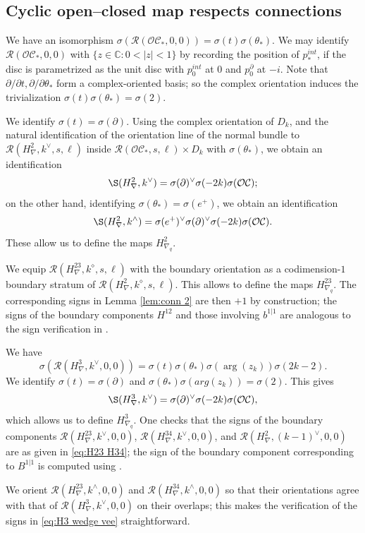 \documentclass{article}
\def\cO{\mathcal{O}}
\def\cC{\mathcal{C}}
\def\cR{\mathcal{R}}
\def\C{\mathbb{C}}
\begin{document}
\subsection{Cyclic open--closed map respects connections}

We have an isomorphism $\sigma(\cR(\cO\cC_*,0,0)) = \sigma(t)\sigma(\theta_*)$. 
We may identify $\cR(\cO\cC_*,0,0)$ with $\{z \in \C: 0<|z|<1\}$ by recording the position of $p_*^{int}$, if the disc is parametrized as the unit disc with $p_0^{int}$ at $0$ and $p_0^\partial$ at $-i$. 
Note that $\partial/\partial t, \partial/\partial \theta_*$ form a complex-oriented basis; so the complex orientation induces the trivialization $\sigma(t)\sigma(\theta_*) = \sigma(2)$.

We identify $\sigma(t) = \sigma(\partial)$. 
Using the complex orientation of $D_k$, and the natural identification of the orientation line of the normal bundle to $\cR(H^2_\nabla,k^\vee,s,\ell)$ inside $\cR(\cO\cC_*,s,\ell) \times D_k$ with $\sigma(\theta_*)$, we obtain an identification
$$\S(H^2_\nabla,k^\vee) = \sigma(\partial)^\vee \sigma(-2k) \sigma(\cO\cC);$$
on the other hand, identifying $\sigma(\theta_*) = \sigma(e^+)$, we obtain an identification
$$\S(H^2_\nabla,k^\wedge) = \sigma(e^+)^\vee\sigma(\partial)^\vee\sigma(-2k)\sigma(\cO\cC).$$
These allow us to define the maps $H^2_{\nabla_q}$.

We equip $\cR(H^{23}_{\nabla},k^\diamond,s,\ell)$ with the boundary orientation as a codimension-$1$ boundary stratum of $\cR(H^2_\nabla,k^\diamond,s,\ell)$. 
This allows to define the maps $H^{23}_{\nabla_q}$. 
The corresponding signs in Lemma \ref{lem:conn 2} are then $+1$ by construction; the signs of the boundary components $H^{12}$ and those involving $b^{1|1}$ are analogous to the sign verification in \cite[Lemma C.6]{relfukii}. 

We have 
$$\sigma(\cR(H^3_\nabla,k^\vee,0,0)) = \sigma(t)\sigma(\theta_*)\sigma(\arg(z_k)) \sigma(2k-2).$$
We identify $\sigma(t) = \sigma(\partial)$ and $\sigma(\theta_*)\sigma(arg(z_k)) = \sigma(2)$. 
This gives 
$$\S(H^3_\nabla,k^\vee) = \sigma(\partial)^\vee\sigma(-2k)\sigma(\cO\cC),$$
which allows us to define $H^3_{\nabla_q}$. 
One checks that the signs of the boundary components $\cR(H^{23}_\nabla,k^\vee,0,0)$, $\cR(H^{34}_\nabla,k^\vee,0,0)$, and $\cR(H^2_\nabla,(k-1)^\vee,0,0)$ are as given in \eqref{eq:H23 H34}; the sign of the boundary component corresponding to $B^{1|1}$ is computed using \cite[Lemma C.2]{relfukii}. 

We orient $\cR(H^{23}_\nabla,k^\wedge,0,0)$ and $\cR(H^{34}_\nabla,k^\wedge,0,0)$ so that their orientations agree with that of $\cR(H^3_\nabla,k^\vee,0,0)$ on their overlaps; this makes the verification of the signs in \eqref{eq:H3 wedge vee} straightforward. 



\end{document}

